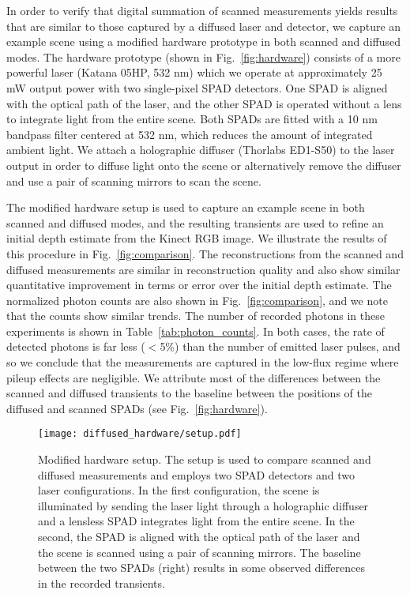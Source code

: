 \documentclass[runningheads]{llncs}
\begin{document}
In order to verify that digital summation of scanned measurements yields results
that are similar to those captured by a diffused laser and detector, we capture
an example scene using a modified hardware prototype in both scanned and
diffused modes. The hardware prototype (shown in Fig.~\ref{fig:hardware})
consists of a more powerful laser (Katana 05HP, 532 nm) which we operate at
approximately 25 mW output power with two single-pixel SPAD detectors. One SPAD
is aligned with the optical path of the laser, and the other SPAD is operated
without a lens to integrate light from the entire scene. Both SPADs are fitted
with a 10 nm bandpass filter centered at 532 nm, which reduces the amount of
integrated ambient light. We attach a holographic diffuser (Thorlabs ED1-S50) to
the laser output in order to diffuse light onto the scene or alternatively
remove the diffuser and use a pair of scanning mirrors to scan the scene.

The modified hardware setup is used to capture an example scene in both scanned and
diffused modes, and the resulting transients are used to refine an initial depth
estimate from the Kinect RGB image. We illustrate the results of this procedure
in Fig.~\ref{fig:comparison}. The reconstructions from the scanned and diffused
measurements are similar in reconstruction quality and also show similar
quantitative improvement in terms or error over the initial depth estimate. The
normalized photon counts are also shown in Fig.~\ref{fig:comparison}, and we
note that the counts show similar trends. The number of recorded photons in
these experiments is shown in Table~\ref{tab:photon_counts}. In both cases, the
rate of detected photons is far less ($<$5\%) than the number of emitted laser
pulses, and so we conclude that the measurements are captured in the low-flux
regime where pileup effects are negligible. We attribute most of the differences
between the scanned and diffused transients to the baseline between the
positions of the diffused and scanned SPADs (see Fig.~\ref{fig:hardware}).

\begin{figure}[H]
  \centering \texttt{[image: diffused\_hardware/setup.pdf]}
  \caption{Modified hardware setup. The setup is used to compare scanned and
  diffused measurements and employs two SPAD detectors and two laser
  configurations. In the first configuration, the scene is illuminated by
  sending the laser light through a holographic diffuser and a lensless SPAD 
  integrates light from the entire scene. In the second, the SPAD is aligned
  with the optical path of the laser and the scene is scanned using a pair of
  scanning mirrors. The baseline between the two SPADs (right) results in some
  observed differences in the recorded transients.}
  \label{fig:dither}
\end{figure}
\end{document}
